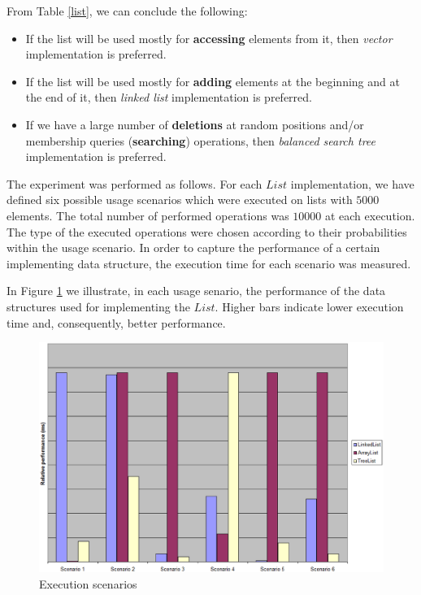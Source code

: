 From Table \ref{list}, we can conclude the following:

\begin{itemize}

\item If the list will be used mostly for \textbf{accessing} elements from it, then \emph{vector} implementation is preferred. 

\item If the list will be used mostly for \textbf{adding} elements at the beginning and at the end of it, then \emph{linked list} implementation is preferred. 

\item If we have a large number of \textbf{deletions} at random positions and/or membership queries (\textbf{searching}) operations, then  \emph{balanced search tree} implementation is preferred.

\end{itemize}


The experiment was performed as follows. For each $List$ implementation, we have defined six possible usage scenarios which were executed on lists with $5000$ elements. The total number of performed operations was $10000$ at each execution. The type of the executed operations were chosen according to their probabilities within the usage scenario. In order to capture the performance of a certain implementing data structure, the execution time for each scenario was measured.

In Figure \ref{scen} we illustrate, in each usage senario, the performance of the data structures used for implementing the $List$. Higher bars indicate lower execution time and, consequently, better performance.


\begin{figure}[h]
   \centering
       \includegraphics[scale=0.25]{scenarios.eps}
              \caption{Execution scenarios}
 \label{scen}
\end{figure}


